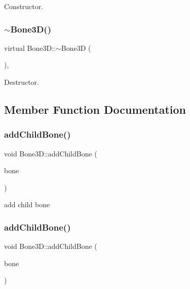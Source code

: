 Constructor. \mbox{\label{classBone3D_a3548570bb866e539f51e8553689d7ce4}} 
\subsubsection{\texorpdfstring{$\sim$\+Bone3\+D()}{~Bone3D()}\hspace{0.1cm}{\footnotesize\ttfamily [2/2]}}
{\footnotesize\ttfamily virtual Bone3\+D\+::$\sim$\+Bone3D (\begin{DoxyParamCaption}{ }\end{DoxyParamCaption})\hspace{0.3cm}{\ttfamily [protected]}, {\ttfamily [virtual]}}

Destructor. 

\subsection{Member Function Documentation}
\mbox{\label{classBone3D_a666a91d8cb1bb98bd953144abe1385c5}} 
\subsubsection{\texorpdfstring{add\+Child\+Bone()}{addChildBone()}\hspace{0.1cm}{\footnotesize\ttfamily [1/2]}}
{\footnotesize\ttfamily void Bone3\+D\+::add\+Child\+Bone (\begin{DoxyParamCaption}\item[{\hyperlink{classBone3D}{Bone3D} $\ast$}]{bone }\end{DoxyParamCaption})}

add child bone \mbox{\label{classBone3D_a666a91d8cb1bb98bd953144abe1385c5}} 
\subsubsection{\texorpdfstring{add\+Child\+Bone()}{addChildBone()}\hspace{0.1cm}{\footnotesize\ttfamily [2/2]}}
{\footnotesize\ttfamily void Bone3\+D\+::add\+Child\+Bone (\begin{DoxyParamCaption}\item[{\hyperlink{classBone3D}{Bone3D} $\ast$}]{bone }\end{DoxyParamCaption})}

